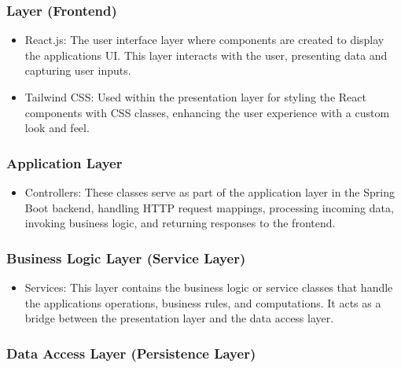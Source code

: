 \subsubsection{Layer (Frontend)}

\begin{itemize}

\item React.js: The user interface layer where components are created to display the applications UI. This layer interacts with the user, presenting data and capturing user inputs.
\item Tailwind CSS: Used within the presentation layer for styling the React components with CSS classes, enhancing the user experience with a custom look and feel.

\end{itemize}

\subsubsection{Application Layer}

\begin{itemize}

\item Controllers: These classes serve as part of the application layer in the Spring Boot backend, handling HTTP request mappings, processing incoming data, invoking business logic, and returning responses to the frontend. \cite{harvardEA2023}

\end{itemize}

\subsubsection{Business Logic Layer (Service Layer)}

\begin{itemize}

\item Services: This layer contains the business logic or service classes that handle the applications operations, business rules, and computations. It acts as a bridge between the presentation layer and the data access layer.

\end{itemize}

\subsubsection{Data Access Layer (Persistence Layer)}


